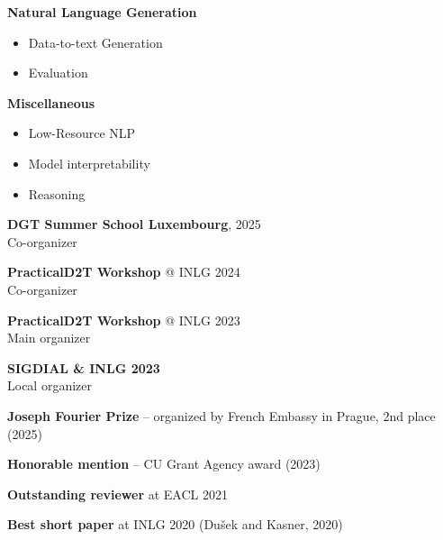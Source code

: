 



\begin{description}[font=\color{accent},style=multiline,leftmargin=1.35em]
    \item[\normalfont\faComment] \textbf{Natural Language Generation} 
    \begin{itemize}
        \item Data-to-text Generation
        \item Evaluation
    \end{itemize} 
    \item[\normalfont\faFlask] \textbf{Miscellaneous}
    \begin{itemize}
        \item Low-Resource NLP
        \item Model interpretability
        \item Reasoning
    \end{itemize} 
\end{description}


\begin{description}[font=\color{accent},style=multiline,leftmargin=1.35em]
    \item[\normalfont\faCircle] \textbf{DGT Summer School Luxembourg}, 2025 \\
    Co-organizer
    \item[\normalfont\faCircle] \textbf{PracticalD2T Workshop} @ INLG 2024 \\
    Co-organizer
    \item[\normalfont\faCircle] \textbf{PracticalD2T Workshop} @ INLG 2023 \\
        Main organizer
    \item[\normalfont\faCircle] \textbf{SIGDIAL \& INLG 2023} \\
    Local organizer
\end{description}


\begin{description}[font=\color{accent},style=multiline,leftmargin=1.35em]
    \item[\normalfont\faFlag] \textbf{Joseph Fourier Prize} -- organized by French Embassy in Prague, 2nd place (2025)
    \item[\normalfont\faMoney] \textbf{Honorable mention} -- CU Grant Agency award (2023) 
    \item[\normalfont\faComments] \textbf{Outstanding reviewer} at EACL 2021
    \item[\normalfont\faTrophy] \textbf{Best short paper} at INLG 2020 (Dušek and Kasner, 2020)
\end{description}



